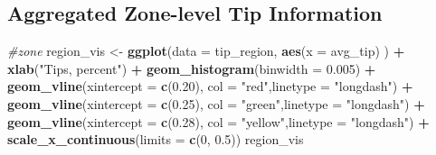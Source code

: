\documentclass[12pt,twoside]{reedthesis}
\newenvironment{Shaded}{\begin{snugshade}}{\end{snugshade}}
\newcommand{\KeywordTok}[1]{\textcolor[rgb]{0.13,0.29,0.53}{\textbf{#1}}}
\newcommand{\DataTypeTok}[1]{\textcolor[rgb]{0.13,0.29,0.53}{#1}}
\newcommand{\DecValTok}[1]{\textcolor[rgb]{0.00,0.00,0.81}{#1}}
\newcommand{\FloatTok}[1]{\textcolor[rgb]{0.00,0.00,0.81}{#1}}
\newcommand{\StringTok}[1]{\textcolor[rgb]{0.31,0.60,0.02}{#1}}
\newcommand{\CommentTok}[1]{\textcolor[rgb]{0.56,0.35,0.01}{\textit{#1}}}
\newcommand{\OperatorTok}[1]{\textcolor[rgb]{0.81,0.36,0.00}{\textbf{#1}}}
\newcommand{\NormalTok}[1]{#1}
\theoremstyle{definition}
\theoremstyle{definition}
\theoremstyle{definition}
\theoremstyle{remark}
\begin{document}
\subsection{Aggregated Zone-level Tip
Information}\label{aggregated-zone-level-tip-information}
\begin{Shaded}
\end{Shaded}
\begin{Shaded}
\begin{Highlighting}[]
\CommentTok{#zone}
\NormalTok{region_vis <-}\StringTok{ }\KeywordTok{ggplot}\NormalTok{(}\DataTypeTok{data =}\NormalTok{ tip_region, }\KeywordTok{aes}\NormalTok{(}\DataTypeTok{x =}\NormalTok{ avg_tip) ) }\OperatorTok{+}
\StringTok{  }\KeywordTok{xlab}\NormalTok{(}\StringTok{"Tips, percent"}\NormalTok{) }\OperatorTok{+}
\StringTok{  }\KeywordTok{geom_histogram}\NormalTok{(}\DataTypeTok{binwidth =} \FloatTok{0.005}\NormalTok{) }\OperatorTok{+}\StringTok{ }
\StringTok{  }\KeywordTok{geom_vline}\NormalTok{(}\DataTypeTok{xintercept =} \KeywordTok{c}\NormalTok{(}\FloatTok{0.20}\NormalTok{), }\DataTypeTok{col =} \StringTok{"red"}\NormalTok{,}\DataTypeTok{linetype =} \StringTok{"longdash"}\NormalTok{) }\OperatorTok{+}
\StringTok{  }\KeywordTok{geom_vline}\NormalTok{(}\DataTypeTok{xintercept =} \KeywordTok{c}\NormalTok{(}\FloatTok{0.25}\NormalTok{), }\DataTypeTok{col =} \StringTok{"green"}\NormalTok{,}\DataTypeTok{linetype =} \StringTok{"longdash"}\NormalTok{) }\OperatorTok{+}
\StringTok{  }\KeywordTok{geom_vline}\NormalTok{(}\DataTypeTok{xintercept =} \KeywordTok{c}\NormalTok{(}\FloatTok{0.28}\NormalTok{), }\DataTypeTok{col =} \StringTok{"yellow"}\NormalTok{,}\DataTypeTok{linetype =} \StringTok{"longdash"}\NormalTok{) }\OperatorTok{+}\StringTok{ }
\StringTok{  }\KeywordTok{scale_x_continuous}\NormalTok{(}\DataTypeTok{limits =} \KeywordTok{c}\NormalTok{(}\DecValTok{0}\NormalTok{, }\FloatTok{0.5}\NormalTok{))}
\NormalTok{region_vis}
\end{Highlighting}
\end{Shaded}
\end{document}
